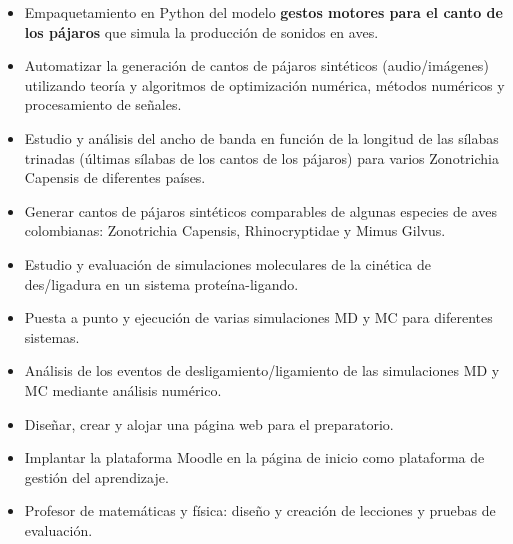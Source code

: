 \documentclass[10pt,letter,ragged2e,withhyper]{altacv}
\begin{document}
\begin{paracol}{2}
\begin{itemize}
\item Empaquetamiento en Python del modelo \textbf{gestos motores para el canto de los pájaros} que simula la producción de sonidos en aves.
\item Automatizar la generación de cantos de pájaros sintéticos (audio/imágenes) utilizando teoría y algoritmos de optimización numérica, métodos numéricos y procesamiento de señales.
\item Estudio y análisis del ancho de banda en función de la longitud de las sílabas trinadas (últimas sílabas de los cantos de los pájaros) para varios Zonotrichia Capensis de diferentes países.
\item Generar cantos de pájaros sintéticos comparables de algunas especies de aves colombianas: Zonotrichia Capensis, Rhinocryptidae y Mimus Gilvus.

\end{itemize}

\divider

\begin{itemize}
\item Estudio y evaluación de simulaciones moleculares de la cinética de des/ligadura en un sistema proteína-ligando.
\item Puesta a punto y ejecución de varias simulaciones MD y MC para diferentes sistemas.
\item Análisis de los eventos de desligamiento/ligamiento de las simulaciones MD y MC mediante análisis numérico.
\end{itemize}

\divider

\begin{itemize}
\item Diseñar, crear y alojar una página web para el preparatorio.
\item Implantar la plataforma Moodle en la página de inicio como plataforma de gestión del aprendizaje.
\item Profesor de matemáticas y física: diseño y creación de lecciones y pruebas de evaluación.
\end{itemize}


\end{paracol}
\end{document}
